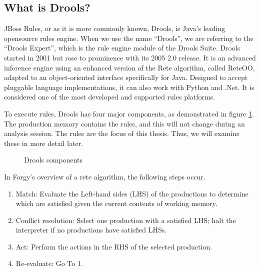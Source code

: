 \subsection{What is Drools?}\label{section:WhatIsDrools}

JBoss Rules, or as it is more commonly known, Drools, is Java's leading opensource rules engine.
When we use the name ``Drools'', we are referring to the ``Drools Expert'', which is the rule engine module of the Drools Suite.
Drools started in 2001 but rose to prominence with its 2005 2.0 release.
It is an advanced inference engine using an enhanced version of the Rete algorithm, called Rete\-OO\cite{sottara2010configurable}, adapted to an object-oriented interface specifically for Java.
Designed to accept pluggable language implementations, it can also work with Python and .Net.
It is considered one of the most developed and supported rules platforms.

To execute rules, Drools has four major components, as demonstrated in figure \ref{fig:Drools_components}.
The production memory contains the rules, and this will not change during an analysis session.
The rules are the focus of this thesis. 
Thus, we will examine these in more detail later.

\begin{figure}[h]
    \centering
    \caption{Drools components}
    \label{fig:Drools_components}
\end{figure}

In Forgy's\cite{forgy1989rete} overview of a rete algorithm, the following steps occur.
\begin{enumerate}
    \setlength\itemsep{0em}
    \item Match: Evaluate the Left-hand sides (LHS) of the productions to determine which are satisfied given the current contents of working memory.
    \item Conflict resolution: Select one production with a satisfied LHS; halt the interpreter if no productions have satisfied LHSs.
    \item Act: Perform the actions in the RHS of the selected production.
    \item Re-evaluate: Go To 1.
\end{enumerate}

